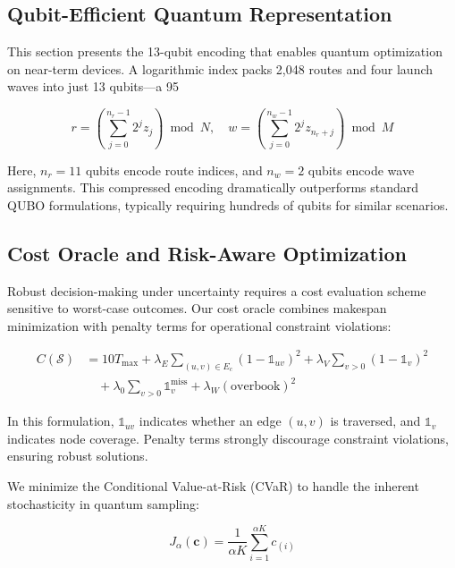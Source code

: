 \subsection{Qubit-Efficient Quantum Representation}

This section presents the 13-qubit encoding that enables quantum optimization on near-term devices. A logarithmic index packs 2,048 routes and four launch waves into just 13 qubits—a 95%

\begin{equation}
r = \left(\sum_{j=0}^{n_r-1} 2^{j} z_j\right) \bmod N, \quad 
w = \left(\sum_{j=0}^{n_w-1} 2^{j} z_{n_r+j}\right) \bmod M
\label{eq:encoding}
\end{equation}

Here, $n_r=11$ qubits encode route indices, and $n_w=2$ qubits encode wave assignments. This compressed encoding dramatically outperforms standard QUBO formulations, typically requiring hundreds of qubits for similar scenarios.

\subsection{Cost Oracle and Risk-Aware Optimization}

Robust decision-making under uncertainty requires a cost evaluation scheme sensitive to worst-case outcomes. Our cost oracle combines makespan minimization with penalty terms for operational constraint violations:

\begin{equation}
\begin{split}
C(\mathcal{S}) &= 10 T_{\max} + \lambda_E \sum_{(u,v)\in E_c} (1-\mathbb{1}_{uv})^2 + \lambda_V \sum_{v>0}(1-\mathbb{1}_v)^2 \\
&\quad + \lambda_0 \sum_{v>0}\mathbb{1}_v^{\text{miss}} + \lambda_W (\text{overbook})^2
\end{split}
\label{eq:cost}
\end{equation}

In this formulation, $\mathbb{1}_{uv}$ indicates whether an edge $(u,v)$ is traversed, and $\mathbb{1}_v$ indicates node coverage. Penalty terms strongly discourage constraint violations, ensuring robust solutions.

We minimize the Conditional Value-at-Risk (CVaR) to handle the inherent stochasticity in quantum sampling:

\begin{equation}
J_{\alpha}(\mathbf{c}) = \frac{1}{\alpha K}\sum_{i=1}^{\alpha K} c_{(i)}
\label{eq:cvar}
\end{equation}

